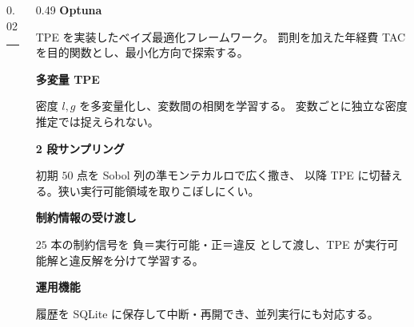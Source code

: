 \begin{frame}[t]
\begin{columns}[T,onlytextwidth]
    \begin{column}{0.02\textwidth}
      \centering
      {\color{black!35}\rule[-6.5cm]{0.6pt}{6.7cm}}
    \end{column}

    \begin{column}{0.49\textwidth}
      {\small\bfseries Optuna}\par
      \vspace{0.5em}
      {\scriptsize\raggedright TPE を実装したベイズ最適化フレームワーク。
        罰則を加えた年経費 TAC を目的関数とし、最小化方向で探索する。\par}
      \vspace{0.6em}
      {\scriptsize\bfseries 多変量 TPE}\par
      \vspace{0.1em}
      {\scriptsize\raggedright 密度 $l,g$ を多変量化し、変数間の相関を学習する。
        変数ごとに独立な密度推定では捉えられない。\par}
      \vspace{0.5em}
      {\scriptsize\bfseries 2 段サンプリング}\par
      \vspace{0.1em}
      {\scriptsize\raggedright 初期 $50$ 点を Sobol 列の準モンテカルロで広く撒き、
        以降 TPE に切替える。狭い実行可能領域を取りこぼしにくい。\par}
      \vspace{0.5em}
      {\scriptsize\bfseries 制約情報の受け渡し}\par
      \vspace{0.1em}
      {\scriptsize\raggedright $25$ 本の制約信号を
        \mbox{負＝実行可能・正＝違反} として渡し、TPE が実行可能解と違反解を分けて学習する。\par}
      \vspace{0.5em}
      {\scriptsize\bfseries 運用機能}\par
      \vspace{0.1em}
      {\scriptsize\raggedright 履歴を SQLite に保存して中断・再開でき、並列実行にも対応する。\par}
    \end{column}
  \end{columns}

\end{frame}
